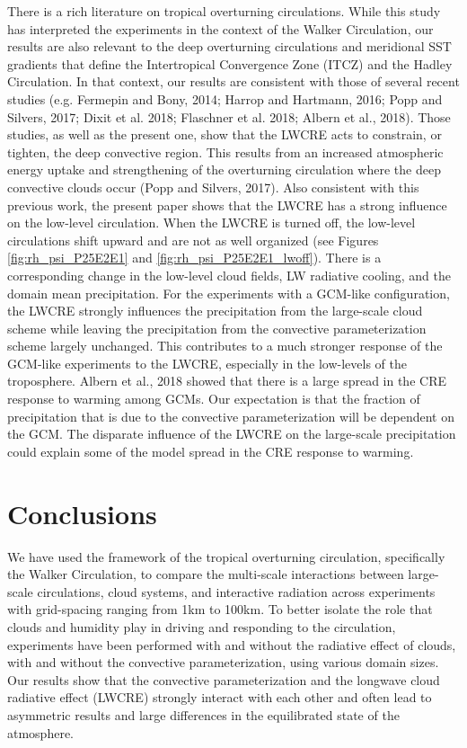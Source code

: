 \documentclass[draft]{agujournal2019}
\begin{document}
{There is a rich literature on tropical overturning circulations.  While this study has interpreted the experiments 
in the context of the Walker Circulation, our results are also relevant to the deep overturning circulations and 
meridional SST gradients that define the Intertropical Convergence Zone (ITCZ) and the Hadley Circulation.  
In that context, our results are consistent with those of several recent studies 
(e.g. Fermepin and Bony, 2014; Harrop and Hartmann, 2016; Popp and Silvers, 2017; Dixit et al. 2018; Flaschner et al. 2018; Albern et al., 2018).  
Those studies, as well as the present one, show that the LWCRE acts to constrain, or tighten, the deep convective region.  
This results from an increased atmospheric energy uptake and strengthening of the overturning circulation where the deep convective clouds occur (Popp and Silvers, 2017).  
Also consistent with this previous work, the present paper shows that the LWCRE has a strong influence on the low-level circulation.   
When the LWCRE is turned off, the low-level circulations shift upward and are not as well organized 
(see Figures \ref{fig:rh_psi_P25E2E1} and \ref{fig:rh_psi_P25E2E1_lwoff}).
There is a corresponding change in the low-level cloud fields, LW radiative cooling, and the domain mean precipitation.
For the experiments with a GCM-like configuration, the LWCRE strongly influences the precipitation from the large-scale
cloud scheme while leaving the precipitation from the convective parameterization scheme largely unchanged.  This 
contributes to a much stronger response of the GCM-like experiments to the LWCRE, especially in the low-levels of the 
troposphere.  
Albern et al., 2018 showed that there is a large spread in the CRE response to warming among GCMs.  
Our expectation is that the fraction of precipitation that is due to the convective parameterization will be dependent on the 
GCM.   The disparate influence of the LWCRE on the large-scale precipitation could explain some of the model
spread in the CRE response to warming.  



\section{Conclusions}


We have used the framework of the tropical overturning circulation, specifically the Walker Circulation, 
to compare the multi-scale interactions between large-scale circulations, cloud systems, and interactive 
radiation across experiments with grid-spacing ranging from 1km to 100km.   
To better isolate the role that clouds and humidity play in driving and responding to the 
circulation, experiments have been performed with and without the radiative effect of clouds, with and without the 
convective parameterization, using various domain sizes.  Our results show that 
the convective parameterization and the longwave cloud radiative effect (LWCRE) strongly interact with each other and 
often lead to asymmetric results and large differences in the equilibrated state of the atmosphere.  

}
\end{document}
